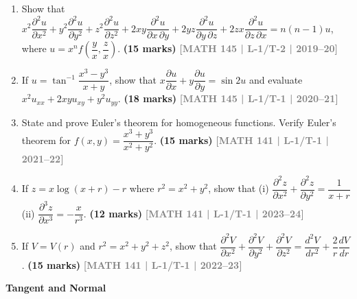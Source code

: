 \documentclass[12pt,a4paper]{article}
\newcommand{\yr}[1]{\hfill\textcolor{gray}{\small\textbf{[#1]}}}
\newcommand{\mk}[1]{\textcolor{orange!70!black}{\small\textbf{(#1 marks)}}}
\newcommand{\subtopic}[2]{%
  \vspace{10pt}
  \noindent\begin{tcolorbox}[colback=#1!8,colframe=#1,boxrule=0.6pt,arc=4pt,
    left=6pt,right=6pt,top=4pt,bottom=4pt]
    \small\bfseries\textcolor{#1}{#2}
  \end{tcolorbox}
  \vspace{2pt}
}
\begin{document}
\begin{enumerate}
\item Show that $x^{2}\dfrac{\partial^{2}u}{\partial x^{2}}+y^{2}\dfrac{\partial^{2}u}{\partial y^{2}}+z^{2}\dfrac{\partial^{2}u}{\partial z^{2}}+2xy\dfrac{\partial^{2}u}{\partial x\,\partial y}+2yz\dfrac{\partial^{2}u}{\partial y\,\partial z}+2zx\dfrac{\partial^{2}u}{\partial z\,\partial x}=n(n-1)u$, where $u=x^{n}f\!\left(\dfrac{y}{x},\dfrac{z}{x}\right)$.
\mk{15} \yr{MATH 145 | L-1/T-2 | 2019--20}

\item If $u=\tan^{-1}\!\dfrac{x^{3}-y^{3}}{x+y}$, show that $x\dfrac{\partial u}{\partial x}+y\dfrac{\partial u}{\partial y}=\sin 2u$ and evaluate $x^{2}u_{xx}+2xyu_{xy}+y^{2}u_{yy}$.
\mk{18} \yr{MATH 145 | L-1/T-1 | 2020--21}

\item State and prove Euler's theorem for homogeneous functions. Verify Euler's theorem for $f(x,y)=\dfrac{x^{3}+y^{3}}{x^{2}+y^{2}}$.
\mk{15} \yr{MATH 141 | L-1/T-1 | 2021--22}

\item If $z=x\log(x+r)-r$ where $r^{2}=x^{2}+y^{2}$, show that (i) $\dfrac{\partial^{2}z}{\partial x^{2}}+\dfrac{\partial^{2}z}{\partial y^{2}}=\dfrac{1}{x+r}$ \quad (ii) $\dfrac{\partial^{3}z}{\partial x^{3}}=-\dfrac{x}{r^{3}}$.
\mk{12} \yr{MATH 141 | L-1/T-1 | 2023--24}

\item If $V=V(r)$ and $r^{2}=x^{2}+y^{2}+z^{2}$, show that $\dfrac{\partial^{2}V}{\partial x^{2}}+\dfrac{\partial^{2}V}{\partial y^{2}}+\dfrac{\partial^{2}V}{\partial z^{2}}=\dfrac{d^{2}V}{dr^{2}}+\dfrac{2}{r}\dfrac{dV}{dr}$.
\mk{15} \yr{MATH 141 | L-1/T-1 | 2022--23}



\end{enumerate}

\subtopic{cA}{Tangent and Normal}
\label{sub:s1-tangnorm}
\end{document}
